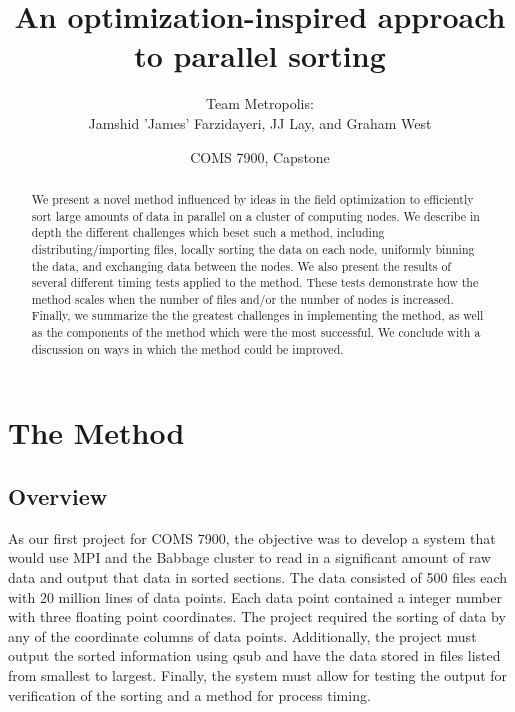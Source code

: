\documentclass{article}
\begin{document}
\title{An optimization-inspired approach to parallel sorting}
\author{Team Metropolis: \\
		Jamshid 'James' Farzidayeri, JJ Lay, and Graham West}
\date{COMS 7900, Capstone}

\maketitle

\begin{abstract}
We present a novel method influenced by ideas in the field optimization to efficiently sort large amounts of data in parallel on a cluster of computing nodes. We describe in depth the different challenges which beset such a method, including distributing/importing files, locally sorting the data on each node, uniformly binning the data, and exchanging data between the nodes. We also present the results of several different timing tests applied to the method. These tests demonstrate how the method scales when the number of files and/or the number of nodes is increased. Finally, we summarize the the greatest challenges in implementing the method, as well as the components of the method which were the most successful. We conclude with a discussion on ways in which the method could be improved.
\end{abstract}


\tableofcontents


\section{The Method}

\subsection{Overview}
As our first project for COMS 7900, the objective was to develop a system that would use MPI and the Babbage cluster to read in a significant amount of raw data and output that data in sorted sections. The data consisted of 500 files each with 20 million lines of data points. Each data point contained a integer number with three floating point coordinates. The project required the sorting of data by any of the coordinate columns of data points. Additionally, the project must output the sorted information using qsub and have the data stored in files listed from smallest to largest. Finally, the system must allow for testing the output for verification of the sorting and a method for process timing.
\end{document}
